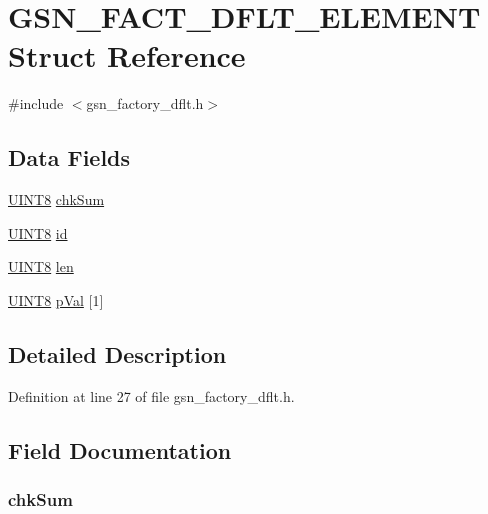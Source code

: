 \hypertarget{a00073}{
\section{GSN\_\-FACT\_\-DFLT\_\-ELEMENT Struct Reference}
\label{a00073}
}


{\ttfamily \#include $<$gsn\_\-factory\_\-dflt.h$>$}

\subsection*{Data Fields}
\begin{DoxyCompactItemize}
\item 
\hyperlink{a00660_gab27e9918b538ce9d8ca692479b375b6a}{UINT8} \hyperlink{a00073_a94c4dd761b5c67ad2d4a08f1a3c46853}{chkSum}
\item 
\hyperlink{a00660_gab27e9918b538ce9d8ca692479b375b6a}{UINT8} \hyperlink{a00073_a583a14d715339a2c22d205223d366263}{id}
\item 
\hyperlink{a00660_gab27e9918b538ce9d8ca692479b375b6a}{UINT8} \hyperlink{a00073_a197a42ec85f4898bd19c17b05bc07d81}{len}
\item 
\hyperlink{a00660_gab27e9918b538ce9d8ca692479b375b6a}{UINT8} \hyperlink{a00073_aac3aa951034de2d06e73a17373c764f3}{pVal} \mbox{[}1\mbox{]}
\end{DoxyCompactItemize}


\subsection{Detailed Description}


Definition at line 27 of file gsn\_\-factory\_\-dflt.h.



\subsection{Field Documentation}
\hypertarget{a00073_a94c4dd761b5c67ad2d4a08f1a3c46853}{
\subsubsection[{chkSum}]{ {\bf chkSum}}}
\label{a00073_a94c4dd761b5c67ad2d4a08f1a3c46853}


